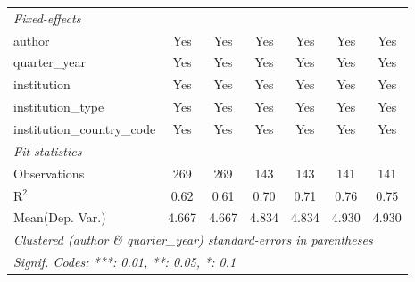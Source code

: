 \begin{tabular}{lcccccc}
   \midrule
   \emph{Fixed-effects}\\
   author                                   & Yes    & Yes     & Yes    & Yes    & Yes    & Yes\\  
   quarter\_year                            & Yes    & Yes     & Yes    & Yes    & Yes    & Yes\\  
   institution                              & Yes    & Yes     & Yes    & Yes    & Yes    & Yes\\  
   institution\_type                        & Yes    & Yes     & Yes    & Yes    & Yes    & Yes\\  
   institution\_country\_code               & Yes    & Yes     & Yes    & Yes    & Yes    & Yes\\  
   \midrule
   \emph{Fit statistics}\\
   Observations                             & 269    & 269     & 143    & 143    & 141    & 141\\  
   R$^2$                                    & 0.62   & 0.61    & 0.70   & 0.71   & 0.76   & 0.75\\  
Mean(Dep. Var.) & 4.667 & 4.667 & 4.834 & 4.834 & 4.930 & 4.930 \\
   \midrule \midrule
   \multicolumn{7}{l}{\emph{Clustered (author \& quarter\_year) standard-errors in parentheses}}\\
   \multicolumn{7}{l}{\emph{Signif. Codes: ***: 0.01, **: 0.05, *: 0.1}}\\
\end{tabular}
\par\endgroup
